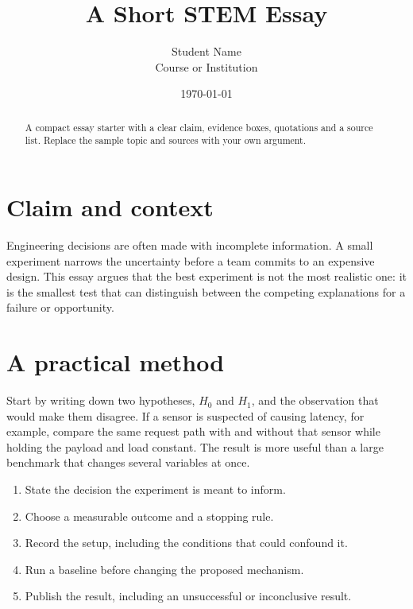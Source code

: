 \documentclass[11pt,a4paper]{article}
\title{A Short STEM Essay}
\author{Student Name \\ Course or Institution}
\date{\today}
\begin{document}
\maketitle
{}

\begin{abstract}
  A compact essay starter with a clear claim, evidence boxes, quotations and
  a source list. Replace the sample topic and sources with your own argument.
\end{abstract}

\section{Claim and context}
Engineering decisions are often made with incomplete information. A small
experiment narrows the uncertainty before a team commits to an expensive
design. This essay argues that the best experiment is not the most realistic
one: it is the smallest test that can distinguish between the competing
explanations for a failure or opportunity.


\section{A practical method}
Start by writing down two hypotheses, $H_0$ and $H_1$, and the observation that
would make them disagree. If a sensor is suspected of causing latency, for
example, compare the same request path with and without that sensor while
holding the payload and load constant. The result is more useful than a large
benchmark that changes several variables at once.

\begin{enumerate}
  \item State the decision the experiment is meant to inform.
  \item Choose a measurable outcome and a stopping rule.
  \item Record the setup, including the conditions that could confound it.
  \item Run a baseline before changing the proposed mechanism.
  \item Publish the result, including an unsuccessful or inconclusive result.
\end{enumerate}
\end{document}
